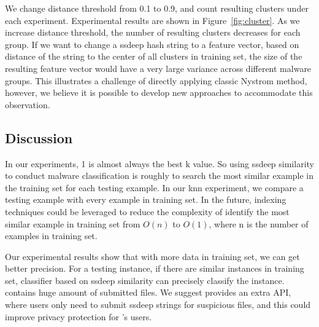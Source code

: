 We change distance threshold from 0.1 to 0.9, 
and count resulting clusters under each experiment. 
Experimental results are shown in Figure~\ref{fig:cluster}. 
As we increase distance threshold, the number of resulting clusters decreases for each group. 
If we want to change a ssdeep hash string to a feature vector, 
based on distance of the string to the center of all clusters in training set, 
the size of the resulting feature vector would have a very large variance across different malware groups. 
This illustrates a challenge of directly applying
classic Nystrom method, however, we believe
it is possible to develop new approaches to
accommodate this observation.




\subsection{Discussion}

In our experiments, 1 is almost always the best k value. 
So using ssdeep similarity to conduct malware classification 
is roughly to search the most similar example in the training set for each testing example.
In our knn experiment, we compare a testing example with every example in training set. 
In the future, indexing techniques could be leveraged to reduce the complexity of identify 
the most similar example in training set from $O(n)$ to $O(1)$, where n is the number of examples in training set. 

Our experimental results show that with more data in training set, 
we can get better precision. 
For a testing instance, if there are similar instances in training set, 
classifier based on ssdeep similarity can precisely classify the instance. 
\vt{} contains huge amount of submitted files. We suggest \vt{} provides an extra API, 
where users only need to submit ssdeep strings for suspicious files, 
and this could improve privacy protection for \vt{}’s users.  



